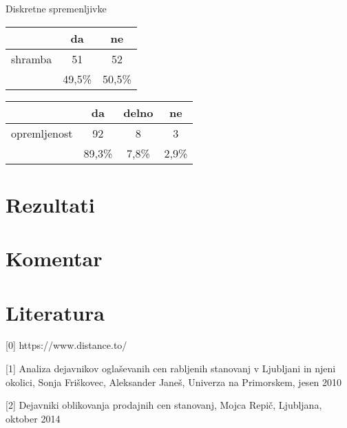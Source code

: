 \documentclass[a4paper, 12pt]{article}
\begin{document}
Diskretne spremenljivke
\begin{center}
\begin{tabular}{ c|c c }
	 & da & ne \\
	\hline
	shramba & 51 & 52 \\
	\hline
	 & 49,5\% & 50,5\% \\
\end{tabular}
\end{center}
\begin{center}
\begin{tabular}{ c|c c c }
	 & da & delno & ne \\
	\hline
	opremljenost & 92 & 8 & 3 \\
	\hline
	 & 89,3\% & 7,8\% & 2,9\% \\
\end{tabular}
\end{center}

\section{Rezultati}

\section{Komentar}

\section{Literatura}

[0]
https://www.distance.to/

[1] Analiza dejavnikov oglaševanih cen rabljenih stanovanj v Ljubljani in njeni
okolici, Sonja Friškovec, Aleksander Janeš, Univerza na Primorskem, jesen 2010

[2] Dejavniki oblikovanja prodajnih cen stanovanj, Mojca Repič, Ljubljana,
oktober 2014
\end{document}
